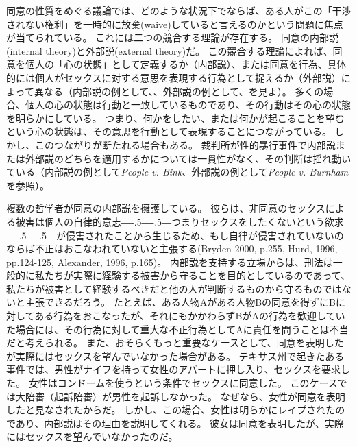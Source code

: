 \documentclass[paper=a4,book,openany]{jlreq}
\def\DDASH{―\kern-.5\zw―\kern-.5\zw―} %
\begin{document}
同意の性質をめぐる議論では、どのような状況下でならば、ある人がこの「干渉されない権利」を一時的に放棄(waive)していると言えるのかという問題に焦点が当てられている。
これには二つの競合する理論が存在する。
同意の内部説(internal theory)と外部説(external theory)だ。
この競合する理論によれば、同意を個人の「心の状態」として定義するか（内部説）、または同意を行為、具体的には個人がセックスに対する意思を表現する行為として捉えるか（外部説）によって異なる（内部説の例として\citet[pp.  124--125]{hurd96:_moral_magic_consen}、\citet[pp.166--167]{alexander96:_moral_magic_consen_ii}、外部説の例として\citet[p.69]{brett98:_sexual_offen_consen}、\citet[p.422]{schulhofer05:_rape_twilig_zone}を見よ）。
多くの場合、個人の心の状態は行動と一致しているものであり、その行動はその心の状態を明らかにしている。
つまり、何かをしたい、または何かが起こることを望むという心の状態は、その意思を行動として表現することにつながっている。
しかし、このつながりが断たれる場合もある。
裁判所が性的暴行事件で内部説または外部説のどちらを適用するかについては一貫性がなく、その判断は揺れ動いている（内部説の例として\emph{People v. Bink}、外部説の例として\emph{People v. Burnham}を参照）。

複数の哲学者が同意の内部説を擁護している。
彼らは、非同意のセックスによる被害は個人の自律的意志{\DDASH}つまりセックスをしたくないという欲求{\DDASH}が侵害されたことから生じるため、もし自律が侵害されていないのならば不正はおこなわれていないと主張する(Bryden 2000, p.255, Hurd, 1996, pp.124-125, Alexander, 1996, p.165)。
\nocite{bryden00:_redef_rape}\nocite{hurd96:_moral_magic_consen}\nocite{alexander96:_moral_magic_consen_ii}
内部説を支持する立場からは、刑法は一般的に私たちが実際に経験する被害から守ることを目的としているのであって、私たちが被害として経験するべきだと他の人が判断するものから守るものではないと主張できるだろう。
たとえば、ある人物Aがある人物Bの同意を得ずにBに対してある行為をおこなったが、それにもかかわらずBがAの行為を歓迎していた場合には、その行為に対して重大な不正行為としてAに責任を問うことは不当だと考えられる。
また、おそらくもっと重要なケースとして、同意を表明したが実際にはセックスを望んでいなかった場合がある。
テキサス州で起きたある事件では、男性がナイフを持って女性のアパートに押し入り、セックスを要求した。
女性はコンドームを使うという条件でセックスに同意した。
このケースでは大陪審（起訴陪審）が男性を起訴しなかった。
なぜなら、女性が同意を表明したと見なされたからだ。
しかし、この場合、女性は明らかにレイプされたのであり、内部説はその理由を説明してくれる。
彼女は同意を表明したが、実際にはセックスを望んでいなかったのだ\citep[cf.][p.137]{hurd96:_moral_magic_consen}。
\end{document}
